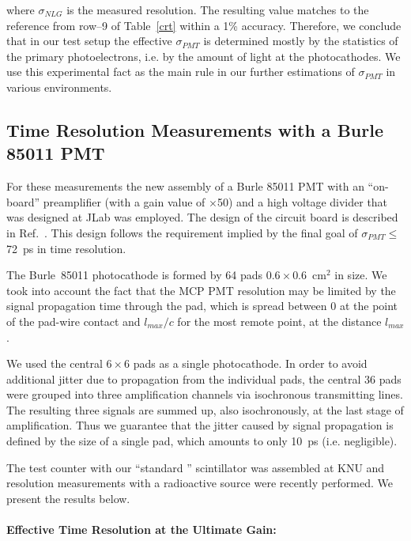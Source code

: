 \noindent
where $\sigma_{NLG}$ is the measured resolution.  The resulting value  
matches to the reference from row--9 of Table~\ref{crt} within a 1\% accuracy.
Therefore, we conclude that in our test setup the effective $\sigma_{PMT}$ 
is determined mostly by the statistics of the primary photoelectrons, i.e. 
by the amount of light at the photocathodes.  We use this experimental fact 
as the main rule in our further estimations of $\sigma_{PMT}$ in various 
environments.

\subsection{Time Resolution Measurements with a Burle 85011 PMT}
\label{meas85011}

For these measurements the new assembly of a Burle 85011 PMT with an 
``on-board'' preamplifier (with a gain value of $\times$50) and a high 
voltage divider that was designed at JLab was employed.  The design of the 
circuit board is described in Ref.~\cite{pa85011}.  This design follows the 
requirement implied by the final goal of $\sigma_{PMT}\le$72~ps in time 
resolution.

The Burle~85011 photocathode is formed by 64 pads $0.6\times0.6$~cm$^2$ in 
size.  We took into account the fact that the MCP PMT resolution may be 
limited by the signal propagation time through the pad, which is spread 
between 0 at the point of the pad-wire contact and $l_{max}/c$ for the most 
remote point, at the distance $l_{max}$.
  
We used the central $6\times6$ pads as a single photocathode.  In order 
to avoid additional jitter due to propagation from the individual pads, the 
central 36 pads were grouped into three amplification channels via isochronous 
transmitting lines.  The resulting three signals are summed up, also 
isochronously, at the last stage of amplification.  Thus we guarantee that 
the jitter caused by signal propagation is defined by the size of a single 
pad, which amounts to only 10~ps (i.e. negligible).

The test counter with our ``standard '' scintillator was assembled at KNU 
and resolution measurements with a radioactive source were recently performed.
We present the results below.

\paragraph*{Effective Time Resolution at the Ultimate Gain:}

